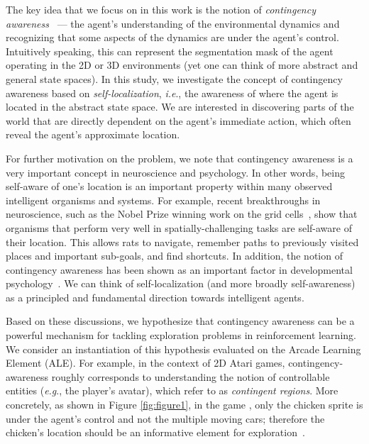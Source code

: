 \documentclass{article} \usepackage{iclr,times}
\makeatletter
\DeclareRobustCommand\onedot{\futurelet\@let@token\@onedot}
\def\onedot{.}
\def\eg{\emph{e.g}\onedot} \def\Eg{\emph{E.g}\onedot}
\def\ie{\emph{i.e}\onedot} \def\Ie{\emph{I.e}\onedot}
\makeatother
\begin{document}
The key idea that we focus on in this work is the notion of \emph{contingency awareness}~\citep{watson1966:contingency,Bellemare:AAAI2012:Contingency}
--- the agent's understanding of the environmental dynamics and recognizing that some aspects of the dynamics are under the agent's control. 
Intuitively speaking, this can represent the segmentation mask of the agent
operating in the 2D or 3D environments (yet one can think of more abstract and general state spaces). 
In this study, we investigate the concept of contingency awareness based on \emph{self-localization}, \ie, the awareness of where the agent is 
located in the abstract state space.
We are interested in discovering parts of the world that are directly dependent on the agent's immediate action, which often reveal the agent's
approximate location.



For further motivation on the problem, we note that contingency awareness is a very important concept in neuroscience and psychology. In other words, being self-aware of one's location is an important property within many observed intelligent organisms and systems.
For example, recent breakthroughs in neuroscience, such as the Nobel Prize winning work on the grid cells~\citep{Moser:2015:GridCell,Banino:Nature2018:NavigateAI}, show that organisms that perform very well in spatially-challenging tasks are self-aware of their location. 
This allows rats to navigate, remember paths to previously visited places and important sub-goals, and find shortcuts. 
In addition, the notion of contingency awareness has been shown as an important factor in developmental psychology~\citep{watson1966:contingency,baeyens1990contingency}. 
We can think of self-localization (and more broadly self-awareness) as a principled and fundamental direction towards intelligent agents.



Based on these discussions, we hypothesize that contingency awareness can be a powerful mechanism for tackling exploration problems in reinforcement learning.
We consider an instantiation of this hypothesis evaluated on the Arcade Learning Element (ALE). 
For example, in the context of 2D Atari games, contingency-awareness roughly corresponds to understanding the notion of controllable entities (\eg, the player's avatar), which \cite{Bellemare:AAAI2012:Contingency} refer to as \emph{contingent regions}. More concretely, as shown in Figure \ref{fig:figure1}, in the game \Freeway, only the chicken sprite is under the agent's control and not the multiple moving cars;
therefore the chicken's location should be an informative element for exploration~\citep{Bellemare:AAAI2012:Contingency,Pathak:ICML2017:Curiosity}.
\end{document}
